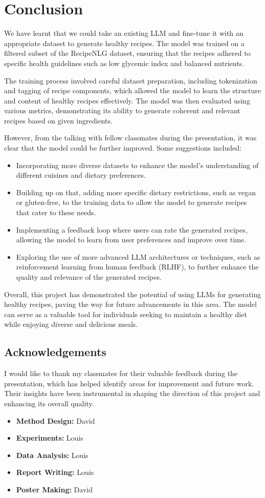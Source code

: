 \section{Conclusion}

We have learnt that we could take an existing LLM and fine-tune it with an appropriate dataset to generate healthy recipes. The model was trained on a filtered subset of the RecipeNLG dataset, ensuring that the recipes adhered to specific health guidelines such as low glycemic index and balanced nutrients.

The training process involved careful dataset preparation, including tokenization and tagging of recipe components, which allowed the model to learn the structure and content of healthy recipes effectively. The model was then evaluated using various metrics, demonstrating its ability to generate coherent and relevant recipes based on given ingredients.

However, from the talking with fellow classmates during the presentation, it was clear that the model could be further improved. Some suggestions included:
\begin{itemize}
	\item Incorporating more diverse datasets to enhance the model's understanding of different cuisines and dietary preferences.
	\item Building up on that, adding more specific dietary restrictions, such as vegan or gluten-free, to the training data to allow the model to generate recipes that cater to these needs.
	\item Implementing a feedback loop where users can rate the generated recipes, allowing the model to learn from user preferences and improve over time.
	\item Exploring the use of more advanced LLM architectures or techniques, such as reinforcement learning from human feedback (RLHF), to further enhance the quality and relevance of the generated recipes.
\end{itemize}

Overall, this project has demonstrated the potential of using LLMs for generating healthy recipes, paving the way for future advancements in this area. The model can serve as a valuable tool for individuals seeking to maintain a healthy diet while enjoying diverse and delicious meals.

\subsection{Acknowledgements}
I would like to thank my classmates for their valuable feedback during the presentation, which has helped identify areas for improvement and future work. Their insights have been instrumental in shaping the direction of this project and enhancing its overall quality.

\begin{itemize}
    \item \textbf{Method Design:} David
    \item \textbf{Experiments:} Louis
    \item \textbf{Data Analysis:} Louis
    \item \textbf{Report Writing:} Louis
    \item \textbf{Poster Making:} David
\end{itemize}
